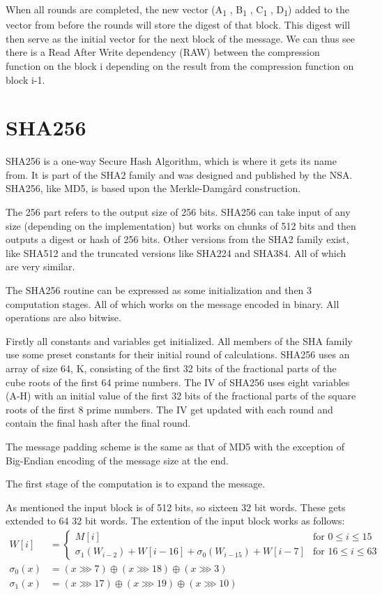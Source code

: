 \documentclass[a4paper, openany]{book}
\begin{document}
When all rounds are completed, the new vector (A\textsubscript{1} , B\textsubscript{1} , C\textsubscript{1} , D\textsubscript{1}) added to the vector from before the rounds will store the digest of that block. This digest will then serve as the initial vector for the next block of the message. We can thus see there is a Read After Write dependency (RAW) between the compression function on the block i depending on the result from the compression function on block i-1.
\section{SHA256}
\label{SHAalg}
SHA256 is a one-way Secure Hash Algorithm, which is where it gets its name from.
It is part of the SHA2 family and was designed and published by the NSA.
SHA256, like MD5, is based upon the Merkle-Damgård construction.

The 256 part refers to the output size of 256 bits.
SHA256 can take input of any size (depending on the implementation) but works
on chunks of 512 bits and then outputs a digest or hash of 256 bits.
Other versions from the SHA2 family exist, like SHA512 and the truncated
versions like SHA224 and SHA384. All of which are very similar.

The SHA256 routine can be expressed as some initialization and then 3 computation stages.
All of which works on the message encoded in binary. All operations are also bitwise.

Firstly all constants and variables get initialized. All members of the SHA family use some preset constants for their initial round of calculations.
SHA256 uses an array of size 64, K, consisting of the first 32 bits of the fractional parts of the cube roots of the first 64 prime numbers.
The IV of SHA256 uses eight variables (A-H) with an initial value of the first 32 bits of the fractional parts of the square roots of the first 8 prime numbers.
The IV get updated with each round and contain the final hash after the final round.

The message padding scheme is the same as that of MD5 with the exception of Big-Endian encoding of the message size at the end.

The first stage of the computation is to expand the message.

As mentioned the input block is of 512 bits, so sixteen 32 bit words. These gets extended to 64 32 bit words.
The extention of the input block works as follows:
\begin{align}\label{eq:W}
  W[i] &=
  \begin{cases}
    M[i]  &\text{for } 0 \leq i \leq 15\\
    \sigma_1(W_{i-2}) + W[i-16] + \sigma_0(W_{i-15}) + W[i-7] &\text{for } 16 \leq i \leq 63
  \end{cases}\\
  \sigma_0(x) &= (x \ggg 7) \oplus (x \ggg 18) \oplus (x \ggg 3)\\
  \sigma_1(x) &= (x \ggg 17) \oplus (x \ggg 19) \oplus (x \ggg 10)
\end{align}
\end{document}
